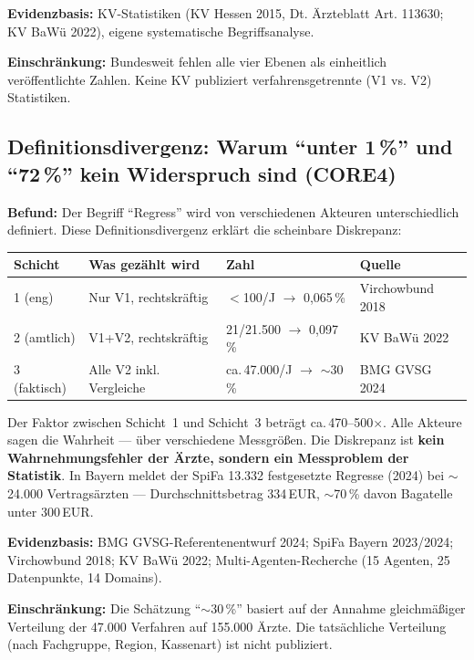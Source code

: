 \documentclass{umbruch-position}
\begin{document}
\textbf{Evidenzbasis:} KV-Statistiken (KV Hessen 2015, Dt. \"Arzteblatt Art. 113630; KV BaW\"u 2022), eigene systematische Begriffsanalyse.

\textbf{Einschr\"ankung:} Bundesweit fehlen alle vier Ebenen als einheitlich ver\"offentlichte Zahlen. Keine KV publiziert verfahrensgetrennte (V1 vs. V2) Statistiken.

\subsection{Definitionsdivergenz: Warum ``unter 1\,\%'' und ``72\,\%'' kein Widerspruch sind (CORE4)}

\textbf{Befund:} Der Begriff ``Regress'' wird von verschiedenen Akteuren unterschiedlich definiert. Diese Definitionsdivergenz erkl\"art die scheinbare Diskrepanz:

\smallskip
{\small
\begin{tabularx}{\textwidth}{l p{4.5cm} l l}
\hline
\textbf{Schicht} & \textbf{Was gez\"ahlt wird} & \textbf{Zahl} & \textbf{Quelle} \\
\hline
1 (eng) & Nur V1, rechtskr\"aftig & ${<}$100/J $\to$ 0,065\,\% & Virchowbund 2018 \\
2 (amtlich) & V1+V2, rechtskr\"aftig & 21/21.500 $\to$ 0,097\,\% & KV BaW\"u 2022 \\
3 (faktisch) & Alle V2 inkl. Vergleiche & ca.\,47.000/J $\to$ ${\sim}$30\,\% & BMG GVSG 2024 \\
\hline
\end{tabularx}
}
\smallskip

Der Faktor zwischen Schicht~1 und Schicht~3 betr\"agt ca.\,470--500$\times$. Alle Akteure sagen die Wahrheit --- \"uber verschiedene Messgr\"o\ss{}en. Die Diskrepanz ist \textbf{kein Wahrnehmungsfehler der \"Arzte, sondern ein Messproblem der Statistik}. In Bayern meldet der SpiFa 13.332 festgesetzte Regresse (2024) bei $\sim$24.000 Vertrags\"arzten --- Durchschnittsbetrag 334\,EUR, $\sim$70\,\% davon Bagatelle unter 300\,EUR.

\textbf{Evidenzbasis:} BMG GVSG-Referentenentwurf 2024; SpiFa Bayern 2023/2024; Virchowbund 2018; KV BaW\"u 2022; Multi-Agenten-Recherche (15 Agenten, 25 Datenpunkte, 14 Domains).

\textbf{Einschr\"ankung:} Die Sch\"atzung ``${\sim}$30\,\%'' basiert auf der Annahme gleichm\"a\ss{}iger Verteilung der 47.000 Verfahren auf 155.000 \"Arzte. Die tats\"achliche Verteilung (nach Fachgruppe, Region, Kassenart) ist nicht publiziert.
\end{document}
